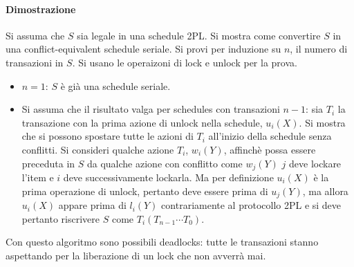 \paragraph{Dimostrazione}
Si assuma che $S$ sia legale in una schedule 2PL. Si mostra come convertire $S$ in una conflict-equivalent schedule seriale. Si provi per induzione su $n$, il numero di transazioni in $S$. Si usano le operaizoni
di lock e unlock per la prova.
\begin{itemize}
\item $n=1$: $S$ \`e gi\`a una schedule seriale. 
\item Si assuma che il risultato valga per schedules con transazioni $n-1$: sia $T_i$ la transazione con la prima azione di unlock nella schedule, $u_i(X)$. Si mostra che si possono spostare tutte le azioni di $T_i$
all'inizio della schedule senza conflitti. Si consideri qualche azione $T_i$, $w_i(Y)$, affinch\`e possa essere preceduta in $S$ da qualche azione con conflitto come $w_j(Y)$ $j$ deve lockare l'item e $i$ deve
successivamente lockarla. Ma per definizione $u_i(X)$ \`e la prima operazione di unlock, pertanto deve essere prima di $u_j(Y)$, ma allora $u_i(X)$ appare prima di $l_i(Y)$ contrariamente al protocollo 2PL e 
si deve pertanto riscrivere $S$ come $T_i(T_{n-1}\cdots T_0)$.
\end{itemize}
Con questo algoritmo sono possibili deadlocks: tutte le transazioni stanno aspettando per la liberazione di un lock che non avverr\`a mai. 
